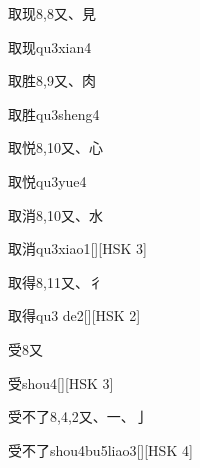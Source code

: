 \begin{entry}{取现}{8,8}{⼜、⾒}
  \begin{phonetics}{取现}{qu3xian4}
  \end{phonetics}
\end{entry}

\begin{entry}{取胜}{8,9}{⼜、⾁}
  \begin{phonetics}{取胜}{qu3sheng4}
  \end{phonetics}
\end{entry}

\begin{entry}{取悦}{8,10}{⼜、⼼}
  \begin{phonetics}{取悦}{qu3yue4}
  \end{phonetics}
\end{entry}

\begin{entry}{取消}{8,10}{⼜、⽔}
  \begin{phonetics}{取消}{qu3xiao1}[][HSK 3]
  \end{phonetics}
\end{entry}

\begin{entry}{取得}{8,11}{⼜、⼻}
  \begin{phonetics}{取得}{qu3 de2}[][HSK 2]
  \end{phonetics}
\end{entry}

\begin{entry}{受}{8}{⼜}
  \begin{phonetics}{受}{shou4}[][HSK 3]
  \end{phonetics}
\end{entry}

\begin{entry}{受不了}{8,4,2}{⼜、⼀、⼅}
  \begin{phonetics}{受不了}{shou4bu5liao3}[][HSK 4]
  \end{phonetics}
\end{entry}

